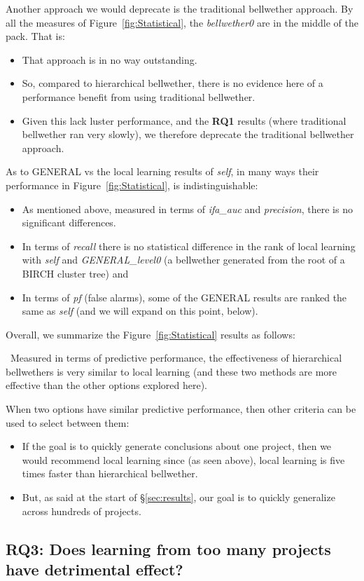 \documentclass[10pt,journal,compsoc]{IEEEtran}
\newcommand{\bi}{\begin{itemize}}
\newcommand{\ei}{\end{itemize}}
\newenvironment{RQ}[1]%
{\noindent\begin{minipage}[c]{\linewidth}%
\begin{bclogo}[couleur=gray!20,%
                arrondi=0.1,logo=\bctrombone,%
                ombre=true%
                ]{{\small  ~#1}}}%
{\end{bclogo}\vspace{2mm}\end{minipage}}
\begin{document}
Another approach we would deprecate is the traditional bellwether approach.
By all the measures of
Figure~\ref{fig:Statistical},   the {\em bellwether0} are in the middle of the pack. That is:
\bi
\item
That approach is in no way outstanding. 
\item
So, 
compared to hierarchical bellwether,
 there is no evidence here of a performance
benefit from using  traditional bellwether.
\item
Given this lack luster performance, 
and   the {\bf RQ1} results (where traditional bellwether ran very slowly), we therefore  
deprecate the traditional bellwether approach.
 \ei
As to GENERAL vs the local learning results of {\em self}, in many ways their performance in  Figure~\ref{fig:Statistical},
is indistinguishable:
\bi
\item As mentioned above, measured in terms of {\em ifa\_auc}
and {\em precision}, there is no significant differences.
\item In terms of {\em recall} there is no statistical difference in the rank
of  local learning with {\em self} and 
  {\em GENERAL\_level0}
(a bellwether
generated from the root of a BIRCH cluster tree) and 
\item In terms of {\em pf} (false alarms), some of the GENERAL results are ranked
the same as {\em self} (and we will expand on this point, below).
\ei
Overall, we summarize the Figure~\ref{fig:Statistical} results as follows:



\begin{RQ}
{Measured in terms of predictive performance,
the effectiveness of hierarchical bellwethers
is very similar to local learning
(and these two methods are more effective
than the other options explored here). }
\end{RQ}

 
When two options have similar predictive
performance, then other criteria can be used
to select between them:
\bi
\item If the goal is to quickly generate
conclusions about one project, then we would recommend
local learning since (as seen above), local learning is five
times faster than hierarchical bellwether.
\item
But, as said at the start
of \S\ref{sec:results},
our goal is to quickly generalize across hundreds of
projects. 
\ei
 



\subsection*{RQ3: Does learning from too many projects have detrimental effect?}
\label{sec:rq4}
\end{document}
